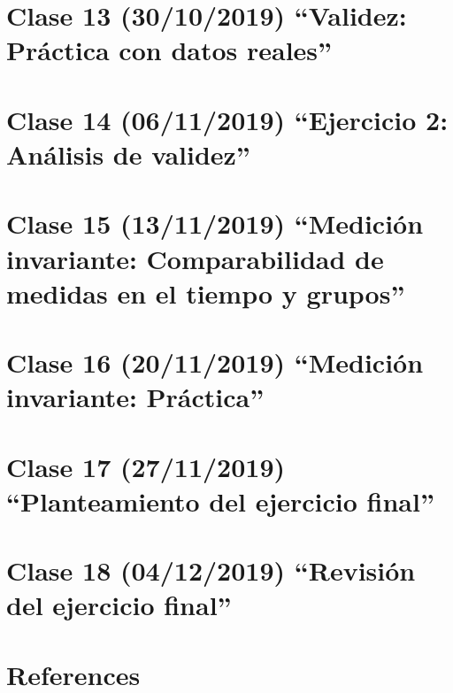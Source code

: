 \documentclass[11pt,]{article}
\begin{document}
\hypertarget{clase-13-30102019-validez-practica-con-datos-reales}{%
\section{Clase 13 (30/10/2019) ``Validez: Práctica con datos
reales''}\label{clase-13-30102019-validez-practica-con-datos-reales}}

\hypertarget{clase-14-06112019-ejercicio-2-analisis-de-validez}{%
\section{Clase 14 (06/11/2019) ``Ejercicio 2: Análisis de
validez''}\label{clase-14-06112019-ejercicio-2-analisis-de-validez}}

\hypertarget{clase-15-13112019-medicion-invariante-comparabilidad-de-medidas-en-el-tiempo-y-grupos}{%
\section{Clase 15 (13/11/2019) ``Medición invariante: Comparabilidad de
medidas en el tiempo y
grupos''}\label{clase-15-13112019-medicion-invariante-comparabilidad-de-medidas-en-el-tiempo-y-grupos}}

\hypertarget{clase-16-20112019-medicion-invariante-practica}{%
\section{Clase 16 (20/11/2019) ``Medición invariante:
Práctica''}\label{clase-16-20112019-medicion-invariante-practica}}

\hypertarget{clase-17-27112019-planteamiento-del-ejercicio-final}{%
\section{Clase 17 (27/11/2019) ``Planteamiento del ejercicio
final''}\label{clase-17-27112019-planteamiento-del-ejercicio-final}}

\hypertarget{clase-18-04122019-revision-del-ejercicio-final}{%
\section{Clase 18 (04/12/2019) ``Revisión del ejercicio
final''}\label{clase-18-04122019-revision-del-ejercicio-final}}

\hypertarget{references}{%
\section{References}\label{references}}
\end{document}
